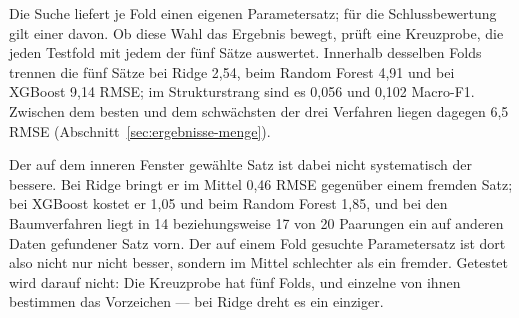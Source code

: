 \documentclass[12pt,a4paper]{article}
\begin{document}
%

Die Suche liefert je Fold einen eigenen Parametersatz; für die Schlussbewertung
gilt einer davon. Ob diese Wahl das Ergebnis bewegt, prüft eine Kreuzprobe, die
jeden Testfold mit jedem der fünf Sätze auswertet. Innerhalb desselben Folds
trennen die fünf Sätze bei Ridge 2,54, beim Random Forest 4,91 und bei XGBoost
9,14 RMSE; im Strukturstrang sind es 0,056 und 0,102 Macro-F1. Zwischen dem
besten und dem schwächsten der drei Verfahren liegen dagegen 6,5 RMSE
(Abschnitt~\ref{sec:ergebnisse-menge}).

Der auf dem inneren Fenster gewählte Satz ist dabei nicht systematisch der
bessere. Bei Ridge bringt er im Mittel 0,46 RMSE gegenüber einem fremden
Satz; bei XGBoost kostet er 1,05 und beim Random Forest 1,85, und bei den
Baumverfahren liegt in 14 beziehungsweise 17 von 20 Paarungen ein auf anderen
Daten gefundener Satz vorn. Der auf einem Fold gesuchte Parametersatz ist dort
also nicht nur nicht besser, sondern im Mittel schlechter als ein fremder.
Getestet wird darauf nicht: Die Kreuzprobe hat fünf Folds, und einzelne von
ihnen bestimmen das Vorzeichen --- bei Ridge dreht es ein einziger.
\end{document}
